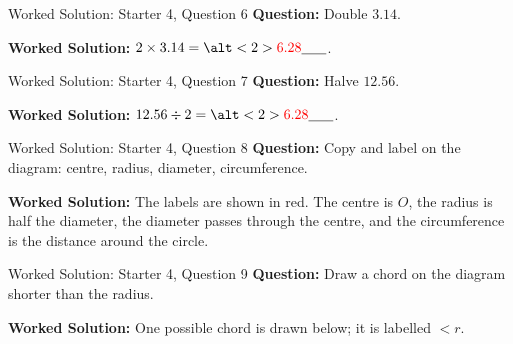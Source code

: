 \documentclass{beamer}
\newcommand{\ablank}[1]{%
  \alt<2>{\textcolor{red}{#1}}{\underline{\phantom{#1}}}%
}
\begin{document}
\begin{frame}{Worked Solution: Starter 4, Question 6}
\small
\textbf{Question:} Double \(3.14\).

\textbf{Worked Solution:} \(2\times3.14=\ablank{6.28}\).
\end{frame}

\begin{frame}{Worked Solution: Starter 4, Question 7}
\small
\textbf{Question:} Halve \(12.56\).

\textbf{Worked Solution:} \(12.56\div2=\ablank{6.28}\).
\end{frame}

\begin{frame}{Worked Solution: Starter 4, Question 8}
\small
\textbf{Question:} Copy and label on the diagram: centre, radius, diameter, circumference.

\begin{center}
\end{center}

\textbf{Worked Solution:} The labels are shown in red. The centre is \(O\), the radius is half the diameter, the diameter passes through the centre, and the circumference is the distance around the circle.
\end{frame}

\begin{frame}{Worked Solution: Starter 4, Question 9}
\small
\textbf{Question:} Draw a chord on the diagram shorter than the radius.

\begin{center}
\end{center}

\textbf{Worked Solution:} One possible chord is drawn below; it is labelled \(<r\).
\end{frame}
\end{document}
